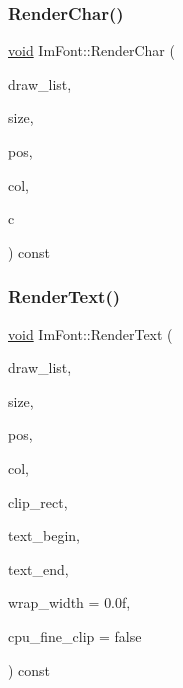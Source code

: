 \subsubsection{\texorpdfstring{Render\+Char()}{RenderChar()}}
{\footnotesize\ttfamily \hyperlink{imgui__impl__opengl3__loader_8h_ac668e7cffd9e2e9cfee428b9b2f34fa7}{void} Im\+Font\+::\+Render\+Char (\begin{DoxyParamCaption}\item[{\hyperlink{structImDrawList}{Im\+Draw\+List} $\ast$}]{draw\+\_\+list,  }\item[{float}]{size,  }\item[{const \hyperlink{structImVec2}{Im\+Vec2} \&}]{pos,  }\item[{Im\+U32}]{col,  }\item[{Im\+Wchar}]{c }\end{DoxyParamCaption}) const}

\mbox{\label{structImFont_a3259517a0d648a40d77beb0c2817382a}} 
\subsubsection{\texorpdfstring{Render\+Text()}{RenderText()}}
{\footnotesize\ttfamily \hyperlink{imgui__impl__opengl3__loader_8h_ac668e7cffd9e2e9cfee428b9b2f34fa7}{void} Im\+Font\+::\+Render\+Text (\begin{DoxyParamCaption}\item[{\hyperlink{structImDrawList}{Im\+Draw\+List} $\ast$}]{draw\+\_\+list,  }\item[{float}]{size,  }\item[{const \hyperlink{structImVec2}{Im\+Vec2} \&}]{pos,  }\item[{Im\+U32}]{col,  }\item[{const \hyperlink{structImVec4}{Im\+Vec4} \&}]{clip\+\_\+rect,  }\item[{const char $\ast$}]{text\+\_\+begin,  }\item[{const char $\ast$}]{text\+\_\+end,  }\item[{float}]{wrap\+\_\+width = {\ttfamily 0.0f},  }\item[{bool}]{cpu\+\_\+fine\+\_\+clip = {\ttfamily false} }\end{DoxyParamCaption}) const}

\mbox{\label{structImFont_a52fbd5caef22c68bb8e0e251c6bfcc53}} 

